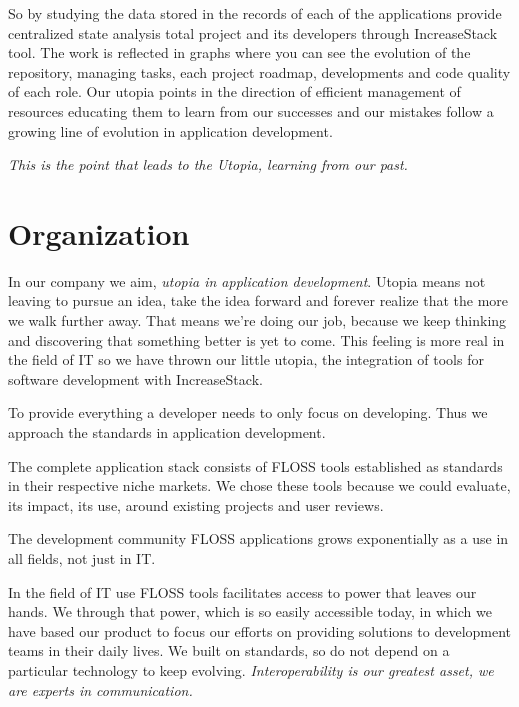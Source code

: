\documentclass[11pt]{scrartcl}
\begin{document}
\par So by studying the data stored in the records of each of the applications provide centralized state analysis total project and its developers through IncreaseStack tool. The work is reflected in graphs where you can see the evolution of the repository, managing tasks, each project roadmap, developments and code quality of each role. Our utopia points in the direction of efficient management of resources educating them to learn from our successes and our mistakes follow a growing line of evolution in application development.

\par \emph{This is the point that leads to the Utopia, learning from our past.}

\section{Organization}

\par In our company we aim, \emph{utopia in application development}. Utopia means not leaving to pursue an idea, take the idea forward and forever realize that the more we walk further away. That means we're doing our job, because we keep thinking and discovering that something better is yet to come. This feeling is more real in the field of IT so we have thrown our little utopia, the integration of tools for software development with IncreaseStack.

\par To provide everything a developer needs to only focus on developing. Thus we approach the standards in application development.

\par The complete application stack consists of FLOSS tools established as standards in their respective niche markets. We chose these tools because we could evaluate, its impact, its use, around existing projects and user reviews.

\par The development community FLOSS applications grows exponentially as a use in all fields, not just in IT.

\par In the field of IT use FLOSS tools facilitates access to power that leaves our hands. We through that power, which is so easily accessible today, in which we have based our product to focus our efforts on providing solutions to development teams in their daily lives. We built on standards, so do not depend on a particular technology to keep evolving. \emph{Interoperability is our greatest asset, we are experts in communication.}
\end{document}
